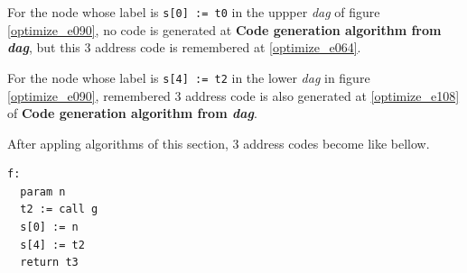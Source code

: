 \begin{Example}
For the node whose label is {\tt{s[0] := t0}} in
the uppper {\em dag} of figure \ref{optimize_e090},
no code is generated at
{\bf Code generation algorithm from {\em dag}},
but this 3 address code is remembered at \ref{optimize_e064}.

For the node whose label is {\tt{s[4] := t2}} in
the lower {\em dag} in figure \ref{optimize_e090}, remembered 3 address code
is also generated at \ref{optimize_e108}
of {\bf Code generation algorithm from {\em dag}}.

After appling algorithms of this section,
3 address codes become like bellow.
\begin{verbatim}
f:
  param n
  t2 := call g
  s[0] := n
  s[4] := t2
  return t3
\end{verbatim}
\end{Example}

